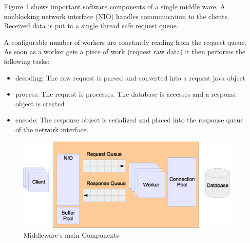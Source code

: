 \documentclass[a4paper]{article}
\begin{document}
Figure \ref{fig:middleware-threading} shows important software components of a single middle ware. A nonblocking network interface (NIO) handles communication to the clients. Received data is put to a single thread safe request queue.

A configurable number of workers are constantly reading from the request queue. As soon as a worker gets a piece of work (request raw data) it then performs the following tasks:
\begin{itemize}
\item decoding: The raw request is parsed and converted into a request java object
\item process: The request is processes. The database is accesses and a response object is created
\item encode: The response object is serialized and placed into the response queue of the network interface.
\end{itemize}


\begin{figure}
	\begin{center}
    \includegraphics[scale=0.4]{../drawings/broker-threading.eps}
  \end{center}
  \caption{Middleware's main Components}
  \label{fig:middleware-threading}
\end{figure}







\end{document}
